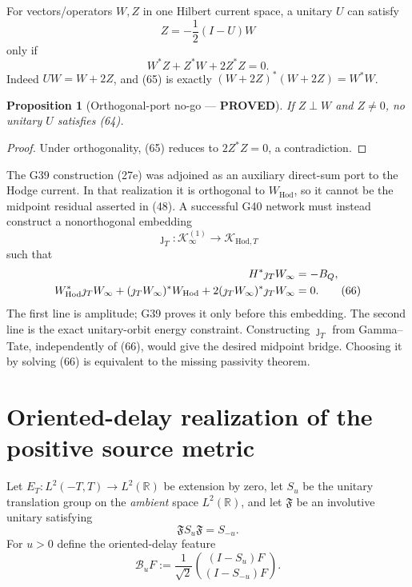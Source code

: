 \documentclass[11pt]{article}
\newtheorem{proposition}[theorem]{Proposition}
\newcommand{\PROVED}{\textcolor{green!45!black}{\textbf{PROVED}}}
\newcommand{\Hod}{\mathrm{Hod}}
\begin{document}
For vectors/operators $W,Z$ in one Hilbert current space, a unitary $U$ can
satisfy
\begin{equation}
 Z=-\frac12(I-U)W                                      \tag{64}
\end{equation}
only if
\begin{equation}
 W^*Z+Z^*W+2Z^*Z=0.                                    \tag{65}
\end{equation}
Indeed $UW=W+2Z$, and (65) is exactly
$(W+2Z)^*(W+2Z)=W^*W$.

\begin{proposition}[Orthogonal-port no-go --- \PROVED]
If $Z\perp W$ and $Z\ne0$, no unitary $U$ satisfies (64).
\end{proposition}

\begin{proof}
Under orthogonality, (65) reduces to $2Z^*Z=0$, a contradiction.
\end{proof}

The G39 construction (27e) was adjoined as an auxiliary direct-sum port to the
Hodge current.  In that realization it is orthogonal to $W_{\Hod}$, so it
cannot be the midpoint residual asserted in (48).  A successful G40 network
must instead construct a nonorthogonal embedding
\[
 \jmath_T:\mathcal K_\infty^{(1)}\to\mathcal K_{\Hod,T}
\]
such that
\begin{align}
 H^*\jmath_TW_\infty&=-B_Q,\notag\\
 W_{\Hod}^*\jmath_TW_\infty
 +(\jmath_TW_\infty)^*W_{\Hod}
 +2(\jmath_TW_\infty)^*\jmath_TW_\infty&=0.            \tag{66}
\end{align}
The first line is amplitude; G39 proves it only before this embedding.  The
second line is the exact unitary-orbit energy constraint.  Constructing
$\jmath_T$ from Gamma--Tate, independently of (66), would give the desired
midpoint bridge.  Choosing it by solving (66) is equivalent to the missing
passivity theorem.

\section{Oriented-delay realization of the positive source metric}

Let $E_T:L^2(-T,T)\to L^2(\mathbb R)$ be extension by zero, let $S_u$ be
the unitary translation group on the \emph{ambient} space $L^2(\mathbb R)$,
and let $\mathfrak F$ be an involutive unitary satisfying
\begin{equation}
 \mathfrak F S_u\mathfrak F=S_{-u}.                     \tag{67}
\end{equation}
For $u>0$ define the oriented-delay feature
\begin{equation}
 \mathcal B_uF:=\frac1{\sqrt2}
 \binom{(I-S_u)F}{(I-S_{-u})F}.                         \tag{68}
\end{equation}
\end{document}
